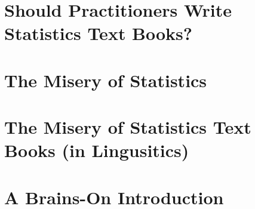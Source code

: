\addchap{\lsPrefaceTitle}

\section*{Should Practitioners Write Statistics Text Books?}

\section*{The Misery of Statistics}

\section*{The Misery of Statistics Text Books (in Lingusitics)}

\section*{A Brains-On Introduction}

